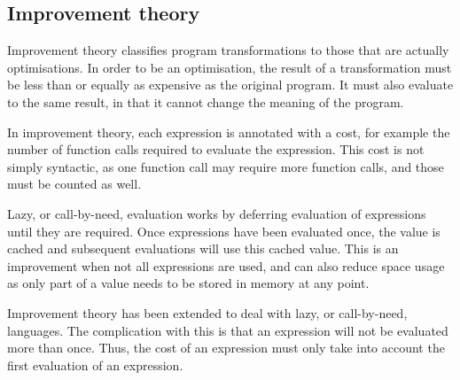 \subsection{Improvement theory}

Improvement theory\cite{sands1998improvement}
classifies program transformations to those that are actually optimisations.
In order to be an optimisation, the result of a transformation must be less than or equally as expensive as the original program.
It must also evaluate to the same result, in that it cannot change the meaning of the program.

In improvement theory, each expression is annotated with a cost, for example the number of function calls required to evaluate the expression.
This cost is not simply syntactic, as one function call may require more function calls, and those must be counted as well.

Lazy, or call-by-need, evaluation works by deferring evaluation of expressions until they are required.
Once expressions have been evaluated once, the value is cached and subsequent evaluations will use this cached value.
This is an improvement when not all expressions are used,
and can also reduce space usage as only part of a value needs to be stored in memory at any point.

Improvement theory has been extended to deal with lazy, or call-by-need, languages\cite{moran1999improvement,gustavsson1999foundation,gustavsson2001possibilities}.
The complication with this is that an expression will not be evaluated more than once.
Thus, the cost of an expression must only take into account the first evaluation of an expression.
